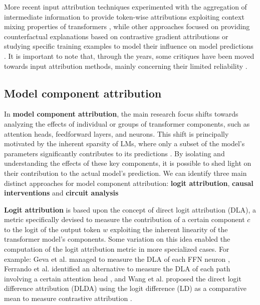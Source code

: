 More recent input attribution techniques experimented with the aggregation of intermediate information to provide token-wise attributions exploiting context mixing properties of transformers , while other approaches focused on providing counterfactual explanations based on contrastive gradient attributions  or studying specific training examples to model their influence on model predictions .
It is important to note that, through the years, some critiques have been moved towards input attribution methods, mainly concerning their limited reliability .

\subsection{Model component attribution}

In \textbf{model component attribution}, the main research focus shifts towards analyzing the effects of individual or groups of transformer components, such as attention heads, feedforward layers, and neurons.
This shift is principally motivated by the inherent sparsity of LMs, where only a subset of the model's parameters significantly contributes to its predictions .
By isolating and understanding the effects of these key components, it is possible to shed light on their contribution to the actual model's prediction.
We can identify three main distinct approaches for model component attribution: \textbf{logit attribution}, \textbf{causal interventions} and \textbf{circuit analysis}

\textbf{Logit attribution} is based upon the concept of direct logit attribution (DLA), a metric specifically devised to measure the contribution of a certain component $c$ to the logit of the output token $w$ exploiting the inherent linearity of the transformer model's components.
Some variation on this idea enabled the computation of the logit attribution metric in more specialized cases.
For example: Geva et al. managed to measure the DLA of each FFN neuron , Ferrando et al. identified an alternative to measure the DLA of each path involving a certain attention head , and Wang et al. proposed the direct logit difference attribution (DLDA) using the logit difference (LD) as a comparative mean to measure contrastive attribution .

